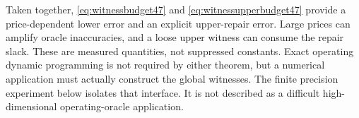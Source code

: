Taken together, \eqref{eq:witnessbudget47} and \eqref{eq:witnessupperbudget47} provide a price-dependent lower error and an explicit upper-repair error. Large prices can amplify oracle inaccuracies, and a loose upper witness can consume the repair slack. These are measured quantities, not suppressed constants. Exact operating dynamic programming is not required by either theorem, but a numerical application must actually construct the global witnesses. The finite precision experiment below isolates that interface. It is not described as a difficult high-dimensional operating-oracle application.

